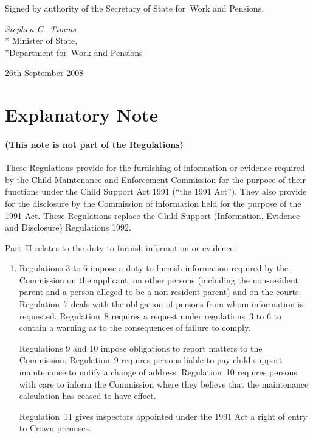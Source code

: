 \documentclass[12pt,a4paper]{article}
\begin{document}
\bigskip

Signed 
by authority of the 
Secretary of State for~Work and Pensions.

{\raggedleft
\emph{Stephen C.~Timms}\\*
Minister
of State,\\*Department for~Work and Pensions

}

26th September 2008

\small

\part{Explanatory Note}

\renewcommand\parthead{— Explanatory Note}

\subsection*{(This note is not part of the Regulations)}

These Regulations provide for the furnishing of information or evidence required by the Child Maintenance and Enforcement Commission for the purpose of their functions under the Child Support Act 1991 (“the 1991 Act”). They also provide for the disclosure by the Commission of information held for the purpose of the 1991 Act. These Regulations replace the Child Support (Information, Evidence and Disclosure) Regulations 1992.

Part~II relates to the duty to furnish information or evidence:
\begin{enumerate}\item[]
Regulations 3 to 6 impose a duty to furnish information required by the Commission on the applicant, on other persons (including the non-resident parent and a person alleged to be a non-resident parent) and on the courts. Regulation~7 deals with the obligation of persons from whom information is requested. Regulation~8 requires a request under regulations~3 to 6 to contain a warning as to the consequences of failure to comply.

Regulations 9 and 10 impose obligations to report matters to the Commission. Regulation~9 requires persons liable to pay child support maintenance to notify a change of address. Regulation~10 requires persons with care to inform the Commission where they believe that the maintenance calculation has ceased to have effect.

Regulation~11 gives inspectors appointed under the 1991 Act a right of entry to Crown premises.
\end{enumerate}
\end{document}
